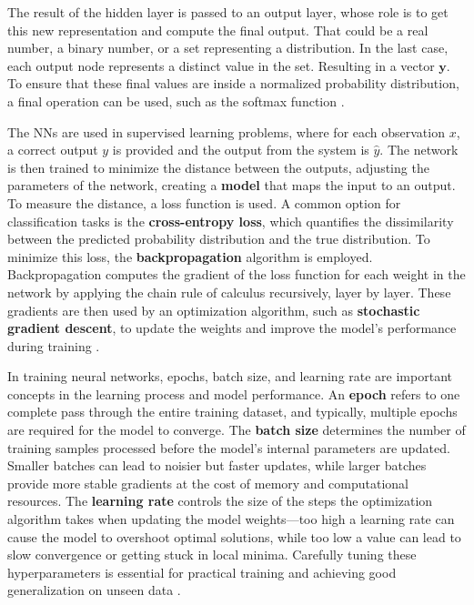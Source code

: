         \newpage
        
        The result of the hidden layer is passed to an output layer, whose role is to get this new representation and compute the final output. That could be a real number, a binary number, or a set representing a distribution. In the last case, each output node represents a distinct value in the set. Resulting in a vector $\textbf{y}$. To ensure that these final values are inside a normalized probability distribution, a final operation can be used, such as the softmax function \cite{jm3_llm_book}.
        
        The NNs are used in supervised learning problems, where for each observation $x$, a correct output $y$ is provided and the output from the system is $\hat{y}$. The network is then trained to minimize the distance between the outputs, adjusting the parameters of the network, creating a \textbf{model} that maps the input to an output. To measure the distance, a loss function is used. A common option for classification tasks is the \textbf{cross-entropy loss}, which quantifies the dissimilarity between the predicted probability distribution and the true distribution. To minimize this loss, the \textbf{backpropagation} algorithm is employed. Backpropagation computes the gradient of the loss function for each weight in the network by applying the chain rule of calculus recursively, layer by layer. These gradients are then used by an optimization algorithm, such as \textbf{stochastic gradient descent}, to update the weights and improve the model’s performance during training \cite{jm3_llm_book}.

        In training neural networks, epochs, batch size, and learning rate are important concepts in the learning process and model performance. An \textbf{epoch} refers to one complete pass through the entire training dataset, and typically, multiple epochs are required for the model to converge. The \textbf{batch size} determines the number of training samples processed before the model's internal parameters are updated. Smaller batches can lead to noisier but faster updates, while larger batches provide more stable gradients at the cost of memory and computational resources. The \textbf{learning rate} controls the size of the steps the optimization algorithm takes when updating the model weights—too high a learning rate can cause the model to overshoot optimal solutions, while too low a value can lead to slow convergence or getting stuck in local minima. Carefully tuning these hyperparameters is essential for practical training and achieving good generalization on unseen data \cite{jm3_llm_book}.
   
